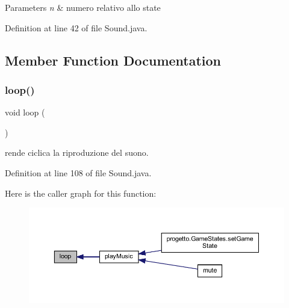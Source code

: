 \begin{DoxyParams}{Parameters}
{\em n} & numero relativo allo state \\
\hline
\end{DoxyParams}


Definition at line 42 of file Sound.\+java.



\subsection{Member Function Documentation}
\mbox{\label{classprogetto_1_1_sound_afe461d27b9c48d5921c00d521181f12f}} 
\subsubsection{\texorpdfstring{loop()}{loop()}}
{\footnotesize\ttfamily void loop (\begin{DoxyParamCaption}{ }\end{DoxyParamCaption})}



rende ciclica la riproduzione del suono. 



Definition at line 108 of file Sound.\+java.

Here is the caller graph for this function\+:\nopagebreak
\begin{figure}[H]
\begin{center}
\leavevmode
\includegraphics[width=350pt]{classprogetto_1_1_sound_afe461d27b9c48d5921c00d521181f12f_icgraph}
\end{center}
\end{figure}
\mbox{\label{classprogetto_1_1_sound_a4641ac073645140bf1f9577c2587fe3b}} 
